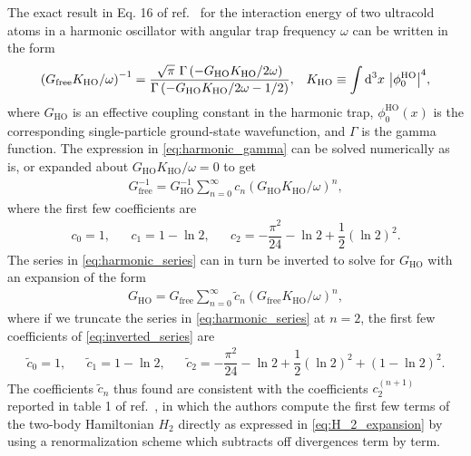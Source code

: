 \documentclass[preprint,showkeys,nofootinbib]{revtex4-1}
\renewcommand{\t}{\text} %
\newcommand{\f}{\dfrac} %
\newcommand{\p}[1]{\left(#1\right)} %
\renewcommand{\d}{\text{d}}
\newcommand{\1}{\mathds{1}}
\begin{document}
The exact result in Eq. 16 of ref.~\cite{busch1998two} for the
interaction energy of two ultracold atoms in a harmonic oscillator
with angular trap frequency $\omega$ can be written in the form
\begin{align}
  \p{G_{\t{free}} K_{\t{HO}}/\omega}^{-1}
  = \f{\sqrt{\pi}~ \Gamma\p{-G_{\t{HO}}K_{\t{HO}}/2\omega}}
  {\Gamma\p{-G_{\t{HO}}K_{\t{HO}}/2\omega-1/2}},
  &&
  K_{\t{HO}} \equiv \int \d^3x~ \abs{\phi_0^{\t{HO}}}^4,
  \label{eq:harmonic_gamma}
\end{align}
where $G_{\t{HO}}$ is an effective coupling constant in the harmonic
trap, $\phi_0^{\t{HO}}\p{x}$ is the corresponding single-particle
ground-state wavefunction, and $\Gamma$ is the gamma function.  The
expression in \eqref{eq:harmonic_gamma} can be solved numerically as
is, or expanded about $G_{\t{HO}}K_{\t{HO}}/\omega=0$ to get
\begin{align}
  G_{\t{free}}^{-1} = G_{\t{HO}}^{-1}
  \sum_{n=0}^\infty c_n \p{G_{\t{HO}}K_{\t{HO}}/\omega}^n,
  \label{eq:harmonic_series}
\end{align}
where the first few coefficients are
\begin{align}
  c_0 = 1,
  &&
  c_1 = 1 - \ln 2,
  &&
  c_2 = -\f{\pi^2}{24} - \ln 2 + \f12 \p{\ln 2}^2.
\end{align}
The series in \eqref{eq:harmonic_series} can in turn be inverted to
solve for $G_{\t{HO}}$ with an expansion of the form
\begin{align}
  G_{\t{HO}} = G_{\t{free}}
  \sum_{n=0}^\infty \tilde c_n \p{G_{\t{free}}K_{\t{HO}}/\omega}^n,
  \label{eq:inverted_series}
\end{align}
where if we truncate the series in \eqref{eq:harmonic_series} at
$n=2$, the first few coefficients of \eqref{eq:inverted_series} are
\begin{align}
  \tilde c_0 = 1,
  &&
  \tilde c_1 = 1 - \ln 2,
  &&
  \tilde c_2 = -\f{\pi^2}{24} - \ln 2 + \f12 \p{\ln 2}^2
  + \p{1 - \ln 2}^2.
  \label{eq:inverted_coefficients}
\end{align}
The coefficients $\tilde c_n$ thus found are consistent with the
coefficients $c_2^{(n+1)}$ reported in table 1 of
ref.~\cite{johnson2012effective}, in which the authors compute the
first few terms of the two-body Hamiltonian $H_2$ directly as
expressed in \eqref{eq:H_2_expansion} by using a renormalization
scheme which subtracts off divergences term by term.
\end{document}
